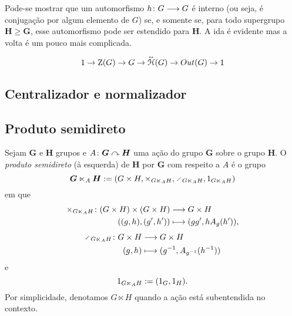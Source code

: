 Pode-se mostrar que um automorfismo ${h}\colon {G} \longrightarrow {G}$ é interno (ou seja, é conjugação por algum elemento de $G$) se, e somente se, para todo supergrupo $\bm H \geq \bm G$, esse automorfismo pode ser estendido para $\bm H$. A ida é evidente mas a volta é um pouco mais complicada\cite{art:Schupp-CharacterizationInnerAutomorphisms}.

	\begin{equation*}
	1 \to \operatorname{Z}(G) \to G \to \accentset{\leftrightarrow}{\mathcal{H}}(G) \to Out(G) \to 1
	\end{equation*}


\subsection{Centralizador e normalizador}






\subsection{Produto semidireto}

\begin{definition}
Sejam $\bm G$ e $\bm H$ grupos e $A\colon \bm G \curvearrowright \bm H$ uma ação do grupo $\bm G$ sobre o grupo $\bm H$. O \emph{produto semidireto} (à esquerda) de $\bm H$ por $\bm G$ com respeito a $A$ é o grupo
	\begin{equation*}
		\bm G \ltimes_A \bm H := (G \times H,\times_{G \ltimes_A H},\div_{G \ltimes_A H},\id_{G \ltimes_A H})
	\end{equation*}
em que
	\begin{align*}
		{\times_{G \ltimes_A H}}\colon {(G \times H) \times (G \times H)} &\longrightarrow {G \times H} \\{((g,h),(g',h'))} &\longmapsto (gg',hA_g(h')),
	\end{align*}
	\begin{align*}
		\func{\div_{G \ltimes_A H}}{G \times H}{G \times H}{(g,h)}{(g\inv,A_{g\inv}(h\inv))}
	\end{align*}
e
	\begin{equation*}
		1_{G \ltimes_A H} := (1_G,1_H).
	\end{equation*}
Por simplicidade, denotamos $G \ltimes H$ quando a ação está subentendida no contexto.

\end{definition}

